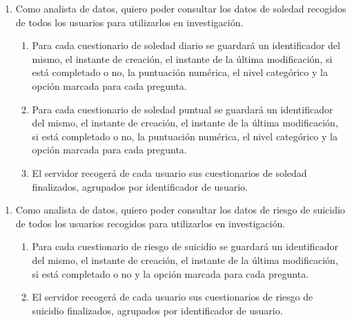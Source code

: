         \begin{enumerate}[resume=req-usuario,label=\textbf{\texttt{RU-\arabic*}}]
            \item \label{req:usuario:analista_soledad} Como analista de datos, quiero poder consultar los datos de soledad recogidos de todos los usuarios para utilizarlos en investigación.
            \begin{enumerate}[resume=req-funcionales,label=\textbf{\texttt{RF-\arabic*}}]
                \item \label{req:funcionales:soledad_diario_formato} Para cada cuestionario de soledad diario se guardará un identificador del mismo, el instante de creación, el instante de la última modificación, si está completado o no, la puntuación numérica, el nivel categórico y la opción marcada para cada pregunta.
                \item \label{req:funcionales:soledad_puntual_formato} Para cada cuestionario de soledad puntual se guardará un identificador del mismo, el instante de creación, el instante de la última modificación, si está completado o no, la puntuación numérica, el nivel categórico y la opción marcada para cada pregunta.
                \item \label{req:funcionales:soledad_finalizado_servidor} El servidor recogerá de cada usuario sus cuestionarios de soledad finalizados, agrupados por identificador de usuario.
            \end{enumerate}
        \end{enumerate}
        \begin{enumerate}[resume=req-usuario,label=\textbf{\texttt{RU-\arabic*}}]
            \item \label{req:usuario:analista_suicidio} Como analista de datos, quiero poder consultar los datos de riesgo de suicidio de todos los usuarios recogidos para utilizarlos en investigación.
            \begin{enumerate}[resume=req-funcionales,label=\textbf{\texttt{RF-\arabic*}}]
                \item \label{req:funcionales:suicidio_diario_formato} Para cada cuestionario de riesgo de suicidio se guardará un identificador del mismo, el instante de creación, el instante de la última modificación, si está completado o no y la opción marcada para cada pregunta.
                \item \label{req:funcionales:suicidio_finalizado_servidor} El servidor recogerá de cada usuario sus cuestionarios de riesgo de suicidio finalizados, agrupados por identificador de usuario.
            \end{enumerate}
        \end{enumerate}
